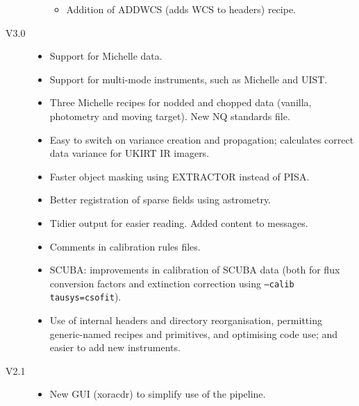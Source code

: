 \documentclass[twoside,11pt]{article}
\renewcommand{\_}{\texttt{\symbol{95}}}
\begin{document}
\begin{description}
\begin{itemize}
\begin{itemize}
\item Addition of ADDWCS (adds WCS to headers) recipe.

\end{itemize}

\end{itemize}

\item[V3.0]

\begin{itemize}

\item Support for Michelle data.

\item Support for multi-mode instruments, such as Michelle and UIST.

\item Three Michelle recipes for nodded and chopped data (vanilla,
  photometry and moving target).  New NQ standards file.

\item Easy to switch on variance creation and propagation; calculates
  correct data variance for UKIRT IR imagers.

\item  Faster object masking using EXTRACTOR instead of PISA.

\item Better registration of sparse fields using astrometry.

\item Tidier output for easier reading.  Added content to messages.

\item Comments in calibration rules files.

\item SCUBA: improvements in calibration of SCUBA data (both for flux
    conversion factors and extinction correction using
     \texttt{--calib tausys=csofit}).

\item Use of internal headers and directory reorganisation, permitting
     generic-named recipes and primitives, and optimising code use;
     and easier to add new instruments.

\end{itemize}

\item[V2.1]

\begin{itemize}

\item New GUI (xoracdr) to simplify use of the pipeline.


\end{itemize}
\end{description}
\end{document}
